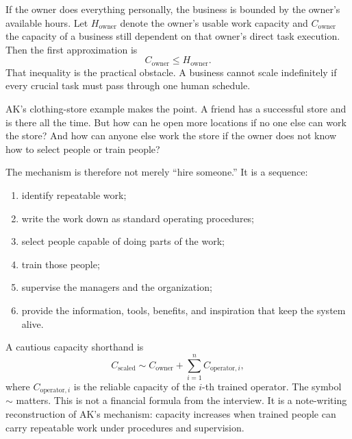 If the owner does everything personally, the business is bounded by the owner's available hours. Let \(H_{\mathrm{owner}}\) denote the owner's usable work capacity and \(C_{\mathrm{owner}}\) the capacity of a business still dependent on that owner's direct task execution. Then the first approximation is
\begin{equation}
C_{\mathrm{owner}} \leq H_{\mathrm{owner}}.
\end{equation}
That inequality is the practical obstacle. A business cannot scale indefinitely if every crucial task must pass through one human schedule.

AK's clothing-store example makes the point. A friend has a successful store and is there all the time. But how can he open more locations if no one else can work the store? And how can anyone else work the store if the owner does not know how to select people or train people?

The mechanism is therefore not merely ``hire someone.'' It is a sequence:
\begin{enumerate}
\item identify repeatable work;
\item write the work down as standard operating procedures;
\item select people capable of doing parts of the work;
\item train those people;
\item supervise the managers and the organization;
\item provide the information, tools, benefits, and inspiration that keep the system alive.
\end{enumerate}

A cautious capacity shorthand is
\begin{equation}
C_{\mathrm{scaled}}
\sim
C_{\mathrm{owner}}
+
\sum_{i=1}^{n} C_{\mathrm{operator},i},
\end{equation}
where \(C_{\mathrm{operator},i}\) is the reliable capacity of the \(i\)-th trained operator. The symbol \(\sim\) matters. This is not a financial formula from the interview. It is a note-writing reconstruction of AK's mechanism: capacity increases when trained people can carry repeatable work under procedures and supervision.


